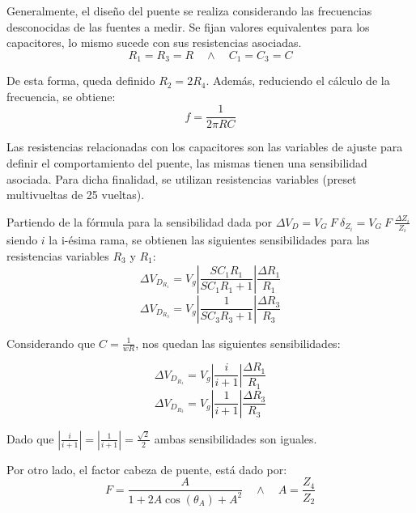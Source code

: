 Generalmente, el diseño del puente se realiza considerando las frecuencias desconocidas de las fuentes a medir. Se fijan valores equivalentes para los capacitores, lo mismo sucede con sus resistencias asociadas. 
\begin{equation}
R_1=R_3=R \quad	\wedge \quad C_1=C_3=C
\end{equation}

De esta forma, queda definido $R_2=2R_4$. Además, reduciendo el cálculo de la frecuencia, se obtiene:
\begin{equation}
f=\frac{1}{2\pi RC}
\label{frec}
\end{equation}

Las resistencias relacionadas con los capacitores son las variables de ajuste para definir el comportamiento del puente, las mismas tienen una sensibilidad asociada. Para dicha finalidad, se utilizan resistencias variables (preset multivueltas de 25 vueltas). 

Partiendo de la fórmula para la sensibilidad dada por $\Delta V_D=V_G \ F \ \delta_{Z_i}=V_G \ F \ \frac{\Delta Z_i}{Z_i}$ siendo $i$ la i-ésima rama, se obtienen las siguientes sensibilidades para las resistencias variables $R_3$ y $R_1$:
\begin{equation}
\Delta V_{D_{R_1}}=V_g\left|\frac{SC_1R_1}{SC_1R_1+1}\right|\frac{\Delta R_1}{R_1}
\end{equation}
\begin{equation}
\Delta V_{D_{R_3}}=V_g\left|\frac{1}{SC_3R_3+1}\right|\frac{\Delta R_3}{R_3}
\end{equation}

Considerando que $C=\frac{1}{wR}$, nos quedan las siguientes sensibilidades:

\begin{equation}
\Delta V_{D_{R_1}}=V_g\left|\frac{i}{i+1}\right|\frac{\Delta R_1}{R_1}
\label{VDR_1}
\end{equation}
\begin{equation}
\Delta V_{D_{R_3}}=V_g\left|\frac{1}{i+1}\right|\frac{\Delta R_3}{R_3}
\label{VDR_3}
\end{equation}

Dado que $\left|\frac{i}{i+1}\right|=\left|\frac{1}{i+1}\right|=\frac{\sqrt{2}}{2}$ ambas sensibilidades son iguales.


Por otro lado, el factor cabeza de puente, está dado por:
\begin{equation}
F=\frac{A}{1+2A\cos(\theta_A)+A^2} \quad \wedge \quad A=\frac{Z_4}{Z_2}
\label{cabeza_de_puente}
\end{equation} 

